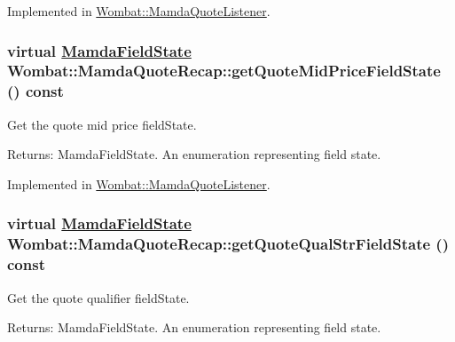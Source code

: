 Implemented in \hyperlink{classWombat_1_1MamdaQuoteListener_9208a03480064d6bd80ed3b95136c752}{Wombat::Mamda\-Quote\-Listener}.\hypertarget{classWombat_1_1MamdaQuoteRecap_5e38936a65a09122e1f1d49619d4a674}{
\subsubsection[getQuoteMidPriceFieldState]{\setlength{\rightskip}{0pt plus 5cm}virtual \hyperlink{namespaceWombat_93aac974f2ab713554fd12a1fa3b7d2a}{Mamda\-Field\-State} Wombat::Mamda\-Quote\-Recap::get\-Quote\-Mid\-Price\-Field\-State () const}}
\label{classWombat_1_1MamdaQuoteRecap_5e38936a65a09122e1f1d49619d4a674}


Get the quote mid price field\-State. 

\begin{Desc}
\item[Returns:]Mamda\-Field\-State. An enumeration representing field state. \end{Desc}


Implemented in \hyperlink{classWombat_1_1MamdaQuoteListener_19d19b0f64db3586e14b88f4a502ecbf}{Wombat::Mamda\-Quote\-Listener}.\hypertarget{classWombat_1_1MamdaQuoteRecap_8dfd4b3dcd940b04e628a741e3dbfb06}{
\subsubsection[getQuoteQualStrFieldState]{\setlength{\rightskip}{0pt plus 5cm}virtual \hyperlink{namespaceWombat_93aac974f2ab713554fd12a1fa3b7d2a}{Mamda\-Field\-State} Wombat::Mamda\-Quote\-Recap::get\-Quote\-Qual\-Str\-Field\-State () const}}
\label{classWombat_1_1MamdaQuoteRecap_8dfd4b3dcd940b04e628a741e3dbfb06}


Get the quote qualifier field\-State. 

\begin{Desc}
\item[Returns:]Mamda\-Field\-State. An enumeration representing field state. \end{Desc}


